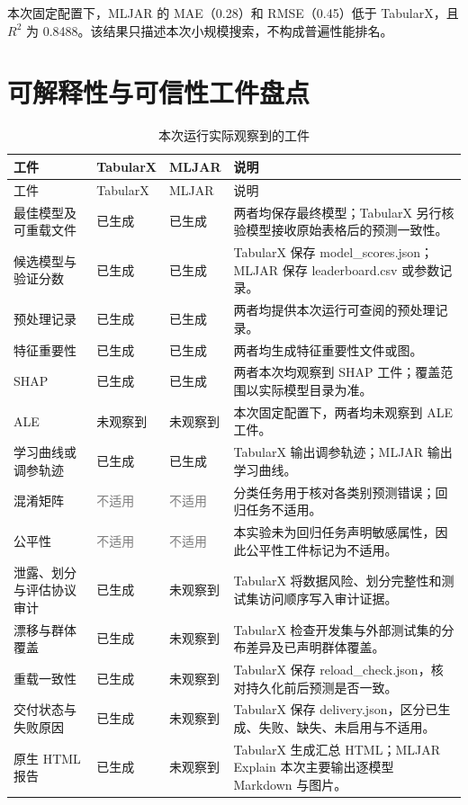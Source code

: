 \documentclass[degree=bachelor,language=chinese,fontset=fandol]{thuthesis}
\newcommand{\yes}{\textcolor{green!50!black}{已生成}}
\newcommand{\no}{\textcolor{red!70!black}{未观察到}}
\newcommand{\na}{\textcolor{gray}{不适用}}
\begin{document}
本次固定配置下，MLJAR 的 MAE（0.28）和 RMSE（0.45）低于 TabularX，且 $R^2$ 为 0.8488。该结果只描述本次小规模搜索，不构成普遍性能排名。

\section{可解释性与可信性工件盘点}
\begin{longtable}{>{\raggedright\arraybackslash}p{}>{\centering\arraybackslash}p{}>{\centering\arraybackslash}p{}>{\raggedright\arraybackslash}p{}}
  \caption{本次运行实际观察到的工件}\label{tab:artifacts}\\
  \toprule
  工件 & TabularX & MLJAR & 说明 \\
  \midrule
  \endfirsthead
  \toprule
  工件 & TabularX & MLJAR & 说明 \\
  \midrule
  \endhead
  最佳模型及可重载文件 & \yes & \yes & 两者均保存最终模型；TabularX 另行核验模型接收原始表格后的预测一致性。 \\
  候选模型与验证分数 & \yes & \yes & TabularX 保存 model\_scores.json；MLJAR 保存 leaderboard.csv 或参数记录。 \\
  预处理记录 & \yes & \yes & 两者均提供本次运行可查阅的预处理记录。 \\
  特征重要性 & \yes & \yes & 两者均生成特征重要性文件或图。 \\
  SHAP & \yes & \yes & 两者本次均观察到 SHAP 工件；覆盖范围以实际模型目录为准。 \\
  ALE & \no & \no & 本次固定配置下，两者均未观察到 ALE 工件。 \\
  学习曲线或调参轨迹 & \yes & \yes & TabularX 输出调参轨迹；MLJAR 输出学习曲线。 \\
  混淆矩阵 & \na & \na & 分类任务用于核对各类别预测错误；回归任务不适用。 \\
  公平性 & \na & \na & 本实验未为回归任务声明敏感属性，因此公平性工件标记为不适用。 \\
  泄露、划分与评估协议审计 & \yes & \no & TabularX 将数据风险、划分完整性和测试集访问顺序写入审计证据。 \\
  漂移与群体覆盖 & \yes & \no & TabularX 检查开发集与外部测试集的分布差异及已声明群体覆盖。 \\
  重载一致性 & \yes & \no & TabularX 保存 reload\_check.json，核对持久化前后预测是否一致。 \\
  交付状态与失败原因 & \yes & \no & TabularX 保存 delivery.json，区分已生成、失败、缺失、未启用与不适用。 \\
  原生 HTML 报告 & \yes & \no & TabularX 生成汇总 HTML；MLJAR Explain 本次主要输出逐模型 Markdown 与图片。 \\
  \bottomrule
\end{longtable}
\end{document}
